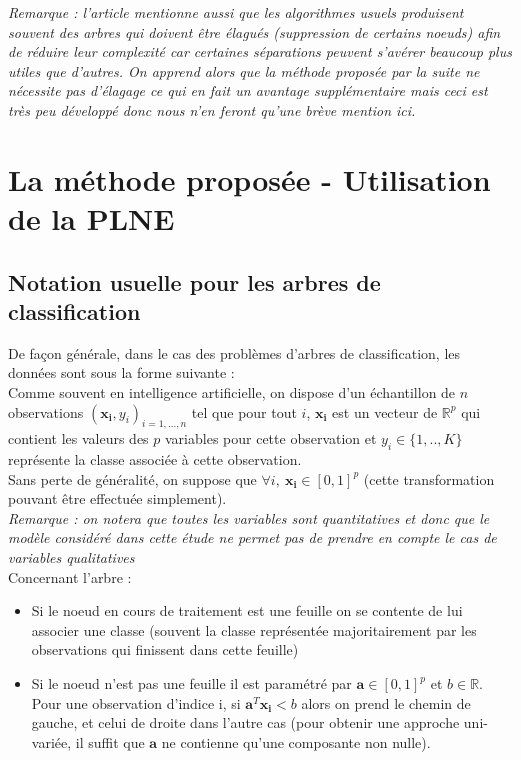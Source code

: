 \documentclass[12pt]{report}
\begin{document}
\textit{Remarque : l'article mentionne aussi que les algorithmes usuels produisent souvent des arbres qui doivent être élagués (suppression de certains noeuds) afin de réduire leur complexité car certaines séparations peuvent s'avérer beaucoup plus utiles que d'autres. On apprend alors que la méthode proposée par la suite ne nécessite pas d'élagage ce qui en fait un avantage supplémentaire mais ceci est très peu développé donc nous n'en feront qu'une brève mention ici.}

\section{La méthode proposée - Utilisation de la PLNE}
\subsection{Notation usuelle pour les arbres de classification}

De façon générale, dans le cas des problèmes d'arbres de classification, les données sont sous la forme suivante :\\
Comme souvent en intelligence artificielle, on dispose d'un échantillon de \(n\) observations \((\mathbf{x_i},y_i)_{i=1,...,n}\) tel que pour tout \(i\), \(\mathbf{x_i}\) est un vecteur de \(\mathbb{R}^p\) qui contient les valeurs des \(p\) variables pour cette observation et \(y_i \in \{1,..,K\}\) représente la classe associée à cette observation.\\
Sans perte de généralité, on suppose que \(\forall i, ~ \mathbf{x_i} \in [0,1]^p\) (cette transformation pouvant être effectuée simplement).\\

\vspace{0.2cm}
\textit{Remarque : on notera que toutes les variables sont quantitatives et donc que le modèle considéré dans cette étude ne permet pas de prendre en compte le cas de variables qualitatives}\\

\vspace{0.2cm}
Concernant l'arbre :
\begin{itemize}
    \item Si le noeud en cours de traitement est une feuille on se contente de lui associer une classe (souvent la classe représentée majoritairement par les observations qui finissent dans cette feuille)
    \item Si le noeud n'est pas une feuille il est paramétré par \(\mathbf{a} \in {[0,1]}^p\) et \(b \in \mathbb{R}\). Pour une observation d'indice i, si \(\mathbf{a}^T\mathbf{x_i} < b\) alors on prend le chemin de gauche, et celui de droite dans l'autre cas (pour obtenir une approche uni-variée, il suffit que \(\mathbf{a}\) ne contienne qu'une composante non nulle).
\end{itemize}
\end{document}

